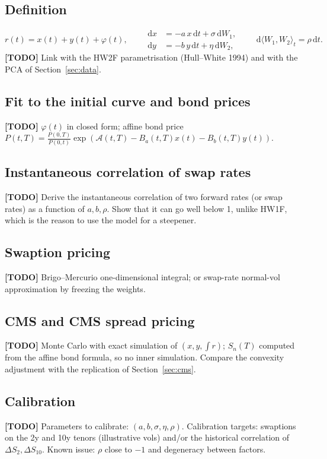 \documentclass[11pt,a4paper]{article}
\theoremstyle{plain}
\theoremstyle{definition}
\newcommand{\dd}{\mathrm{d}}
\newcommand{\todo}[1]{\textcolor{red!70!black}{\textbf{[TODO]} #1}}
\begin{document}
\subsection{Definition}
\begin{equation}
    r(t) = x(t)+y(t)+\varphi(t),\qquad
    \begin{aligned}
        \dd x &= -a\,x\,\dd t + \sigma\,\dd W_1,\\
        \dd y &= -b\,y\,\dd t + \eta\,\dd W_2,
    \end{aligned}\qquad \dd\langle W_1,W_2\rangle_t=\rho\,\dd t.
    \label{eq:g2}
\end{equation}
\todo{Link with the HW2F parametrisation (Hull--White 1994) and with the PCA of Section~\ref{sec:data}.}

\subsection{Fit to the initial curve and bond prices}
\todo{$\varphi(t)$ in closed form; affine bond price $P(t,T)=\frac{P(0,T)}{P(0,t)}\exp(\mathcal{A}(t,T)-B_a(t,T)x(t)-B_b(t,T)y(t))$.}

\subsection{Instantaneous correlation of swap rates}
\todo{Derive the instantaneous correlation of two forward rates (or swap rates) as a function of $a,b,\rho$. Show that it can go well below 1, unlike HW1F, which is the reason to use the model for a steepener.}

\subsection{Swaption pricing}
\todo{Brigo--Mercurio one-dimensional integral; or swap-rate normal-vol approximation by freezing the weights.}

\subsection{CMS and CMS spread pricing}
\todo{Monte Carlo with exact simulation of $(x,y,\int r)$; $S_n(T)$ computed from the affine bond formula, so no inner simulation. Compare the convexity adjustment with the replication of Section~\ref{sec:cms}.}

\subsection{Calibration}
\todo{Parameters to calibrate: $(a,b,\sigma,\eta,\rho)$. Calibration targets: swaptions on the 2y and 10y tenors (illustrative vols) and/or the historical correlation of $\Delta S_2,\Delta S_{10}$. Known issue: $\rho$ close to $-1$ and degeneracy between factors.}
\end{document}
